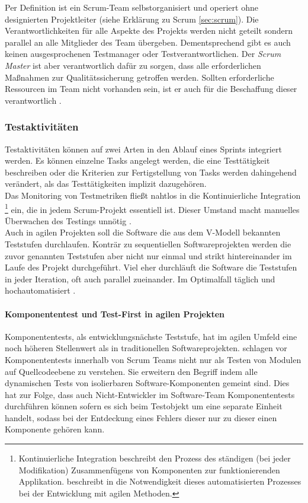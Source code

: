 Per Definition ist ein Scrum-Team selbstorganisiert und operiert ohne designierten Projektleiter (siehe Erklärung zu Scrum \ref{sec:scrum}). Die Verantwortlichkeiten für alle Aspekte des Projekts werden nicht geteilt sondern parallel an alle Mitglieder des Team übergeben. Dementsprechend gibt es auch keinen ausgesprochenen Testmanager oder Testverantwortlichen. Der \textit{Scrum Master} ist aber verantwortlich dafür zu sorgen, dass alle erforderlichen Maßnahmen zur Qualitätssicherung getroffen werden. Sollten erforderliche Ressourcen im Team nicht vorhanden sein, ist er auch für die Beschaffung dieser verantwortlich \cite{linz_testing_2014}.\\

\subsubsection{Testaktivitäten}
Testaktivitäten können auf zwei Arten in den Ablauf eines Sprints integriert werden. Es können einzelne Tasks angelegt werden, die eine Testtätigkeit beschreiben oder die Kriterien zur Fertigstellung von Tasks werden dahingehend verändert, als das Testtätigkeiten implizit dazugehören.\\
Das Monitoring von Testmetriken fließt nahtlos in die Kontinuierliche Integration \footnote{Kontinuierliche Integration beschreibt den Prozess des ständigen (bei jeder Modifikation) Zusammenfügens von Komponenten zur funktionierenden Applikation. \citeauthor{linz_testing_2014} beschreibt in \cite{linz_testing_2014} die Notwendigkeit dieses automatisierten Prozesses bei der Entwicklung mit agilen Methoden.} ein, die in jedem Scrum-Projekt essentiell ist. Dieser Umstand macht manuelles Überwachen des Testings unnötig \cite{linz_testing_2014}.\\
Auch in agilen Projekten soll die Software die aus dem V-Modell bekannten Teststufen durchlaufen. Konträr zu sequentiellen Softwareprojekten werden die zuvor genannten Teststufen aber nicht nur einmal und strikt hintereinander im Laufe des Projekt durchgeführt. Viel eher durchläuft die Software die Teststufen in jeder Iteration, oft auch parallel zueinander. Im Optimalfall täglich und hochautomatisiert \cite{linz_testing_2014}.

\paragraph{Komponententest und Test-First in agilen Projekten}   
Komponententests, als entwicklungsnächste Teststufe, hat im agilen Umfeld eine noch höheren Stellenwert als in traditionellen Softwareprojekten. \citeauthor{spillner_software_2014} schlagen vor Komponententests innerhalb von Scrum Teams nicht nur als Testen von Modulen auf Quellcodeebene zu verstehen. Sie erweitern den Begriff indem alle dynamischen Tests von isolierbaren Software-Komponenten gemeint sind. Dies hat zur Folge, dass auch Nicht-Entwickler im Software-Team Komponententests durchführen können sofern es sich beim Testobjekt um eine separate Einheit handelt, sodass bei der Entdeckung eines Fehlers dieser nur zu dieser einen Komponente gehören kann.\\

